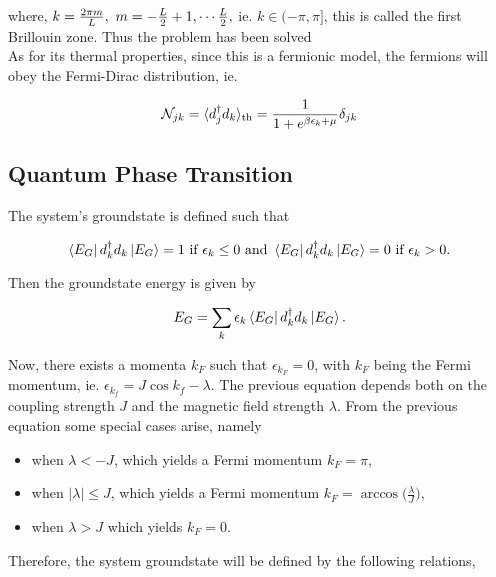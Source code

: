 \documentclass{homework}
\begin{document}
where, $k = \frac{2\pi m}{L}, \textnormal{ } m = -\frac{L}{2} + 1, \cdots \frac{L}{2}, $ ie. $k \in (-\pi, \pi]$, this is called the first Brillouin zone. Thus the problem has been solved \\

As for its thermal properties, since this is a fermionic model, the fermions will obey the Fermi-Dirac distribution, ie. 

\begin{equation}
    \mathcal{N}_{jk} = \langle d_j^\dagger d_k \rangle_{\textnormal{th}} =  \frac{1}{1+e^{\beta \epsilon_k + \mu}} \delta_{jk} 
\end{equation}

\clearpage

\subsection{Quantum Phase Transition}

The system's groundstate is defined such that 

\begin{equation}
    \bra{E_G} d_k^\dagger d_k \ket{E_G} = 1 \textnormal{ if } \epsilon_k \leq 0 \textnormal{ and } \bra{E_G} d_k^\dagger d_k \ket{E_G} = 0 \textnormal{ if } \epsilon_k > 0.
\end{equation}

Then the groundstate energy is given by 

\begin{equation}
    E_G = \sum_{k} \epsilon_k \bra{E_G} d_k^\dagger d_k \ket{E_G}.
\end{equation}

Now, there exists a momenta $k_F$ such that $\epsilon_{k_F} = 0$, with $k_F$ being the Fermi momentum, ie. $\epsilon_{k_f} = J \cos k_f - \lambda$. The previous equation depends both on the coupling strength $J$ and the magnetic field strength $\lambda$. From the previous equation some special cases arise, namely 

\begin{itemize}
    \item when $\lambda < -J$, which yields a Fermi momentum $k_F = \pi$,
    \item when $|\lambda| \leq J$, which yields a Fermi momentum $k_F = \arccos \bigg(\frac{\lambda}{J}\bigg)$,
    \item when $\lambda > J$ which yields $k_F = 0$.
\end{itemize}

Therefore, the system groundstate will be defined by the following relations, 
\end{document}
